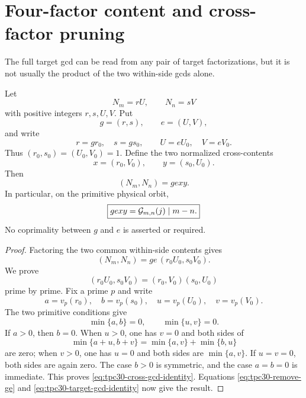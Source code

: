 \section{Four-factor content and cross-factor pruning}
\label{sec:tpc30-cross-content}

The full target gcd can be read from any pair of target
factorizations, but it is not usually the product of the two
within-side gcds alone.

\begin{proposition}
\label{prop:tpc30-four-factor-content}
Let
\begin{equation}
 N_m=rU,\qquad N_n=sV
 \label{eq:tpc30-two-factorizations}
\end{equation}
with positive integers $r,s,U,V$.  Put
\begin{equation}
 g=(r,s),\qquad e=(U,V),
 \label{eq:tpc30-within-contents}
\end{equation}
and write
\begin{equation}
 r=gr_0,\quad s=gs_0,\qquad
 U=eU_0,\quad V=eV_0.
 \label{eq:tpc30-primitive-factorizations}
\end{equation}
Thus $(r_0,s_0)=(U_0,V_0)=1$.  Define the two normalized
cross-contents
\begin{equation}
 x=(r_0,V_0),\qquad y=(s_0,U_0).
 \label{eq:tpc30-cross-contents}
\end{equation}
Then
\begin{equation}
 \boxed{
 (N_m,N_n)=gexy.}
 \label{eq:tpc30-four-factor-identity}
\end{equation}
In particular, on the primitive physical orbit,
\begin{equation}
 \boxed{
 gexy=\mathcal G_{m,n}(j)\mid m-n.}
 \label{eq:tpc30-four-factor-determinant}
\end{equation}
No coprimality between $g$ and $e$ is asserted or required.
\end{proposition}

\begin{proof}
Factoring the two common within-side contents gives
\begin{equation}
 (N_m,N_n)
 =ge\,(r_0U_0,s_0V_0).
 \label{eq:tpc30-remove-ge}
\end{equation}
We prove
\begin{equation}
 (r_0U_0,s_0V_0)
 =(r_0,V_0)(s_0,U_0)
 \label{eq:tpc30-cross-gcd-identity}
\end{equation}
prime by prime.  Fix a prime $p$ and write
\[
 a=v_p(r_0),\quad b=v_p(s_0),\quad
 u=v_p(U_0),\quad v=v_p(V_0).
\]
The two primitive conditions give
\[
 \min\{a,b\}=0,\qquad \min\{u,v\}=0.
\]
If $a>0$, then $b=0$.  When $u>0$, one has $v=0$ and both sides of
\begin{equation}
 \min\{a+u,b+v\}
 =\min\{a,v\}+\min\{b,u\}
 \label{eq:tpc30-valuation-identity}
\end{equation}
are zero; when $v>0$, one has $u=0$ and both sides are
$\min\{a,v\}$.  If $u=v=0$, both sides are again zero.  The case
$b>0$ is symmetric, and the case
$a=b=0$ is immediate.  This proves
\eqref{eq:tpc30-cross-gcd-identity}.  Equations
\eqref{eq:tpc30-remove-ge} and
\eqref{eq:tpc30-target-gcd-identity} now give the result.
\end{proof}

